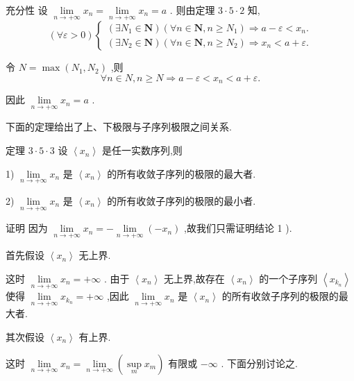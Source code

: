 充分性 设 $\mathop{\lim }\limits_{{n \rightarrow   + \infty }}{x}_{n} = \mathop{\lim }\limits_{{n \rightarrow   + \infty }}{x}_{n} = a$ . 则由定理 $3 \cdot  5 \cdot  2$ 知,
$$\left( {\forall \varepsilon  > 0}\right) \left\{  \begin{array}{l} \left( {\exists {N}_{1} \in  \mathbf{N}}\right) \left( {\forall n \in  \mathbf{N},n \geq  {N}_{1}}\right)  \Rightarrow  a - \varepsilon  < {x}_{n}. \\  \left( {\exists {N}_{2} \in  \mathbf{N}}\right) \left( {\forall n \in  \mathbf{N},n \geq  {N}_{2}}\right)  \Rightarrow  {x}_{n} < a + \varepsilon . \end{array}\right.$$

令 $N = \max \left( {{N}_{1},{N}_{2}}\right)$ ,则
$$\forall n \in  N,n \geq  N \Rightarrow  a - \varepsilon  < {x}_{n} < a + \varepsilon .$$

因此 $\mathop{\lim }\limits_{{n \rightarrow   + \infty }}{x}_{n} = a$ .

下面的定理给出了上、下极限与子序列极限之间关系.

定理 $3 \cdot  5 \cdot  3$ 设 $\left\langle  {x}_{n}\right\rangle$ 是任一实数序列,则

1) $\mathop{\lim }\limits_{{n \rightarrow   + \infty }}{x}_{n}$ 是 $\left\langle  {x}_{n}\right\rangle$ 的所有收敛子序列的极限的最大者.

2) $\mathop{\lim }\limits_{{n \rightarrow   + \infty }}{x}_{n}$ 是 $\left\langle  {x}_{n}\right\rangle$ 的所有收敛子序列的极限的最小者.

证明 因为 $\mathop{\lim }\limits_{{n \rightarrow   + \infty }}{x}_{n} =  - \mathop{\lim }\limits_{{n \rightarrow   + \infty }}\left( {-{x}_{n}}\right)$ ,故我们只需证明结论 1 ).

首先假设 $\left\langle  {x}_{n}\right\rangle$ 无上界.

这时 $\mathop{\lim }\limits_{{n \rightarrow   + \infty }}{x}_{n} =  + \infty$ . 由于 $\left\langle  {x}_{n}\right\rangle$ 无上界,故存在 $\left\langle  {x}_{n}\right\rangle$ 的一个子序列 $\left\langle  {x}_{{k}_{n}}\right\rangle$ 使得 $\mathop{\lim }\limits_{{n \rightarrow   + \infty }}{x}_{{k}_{n}} =  + \infty$ ,因此 $\mathop{\lim }\limits_{{n \rightarrow   + \infty }}{x}_{n}$ 是 $\left\langle  {x}_{n}\right\rangle$ 的所有收敛子序列的极限的最大者.

其次假设 $\left\langle  {x}_{n}\right\rangle$ 有上界.

这时 $\mathop{\lim }\limits_{{n \rightarrow   + \infty }}{x}_{n} = \mathop{\lim }\limits_{{n \rightarrow   + \infty }}\left( {\mathop{\sup }\limits_{m}{x}_{m}}\right)$ 有限或 $- \infty$ . 下面分别讨论之.

